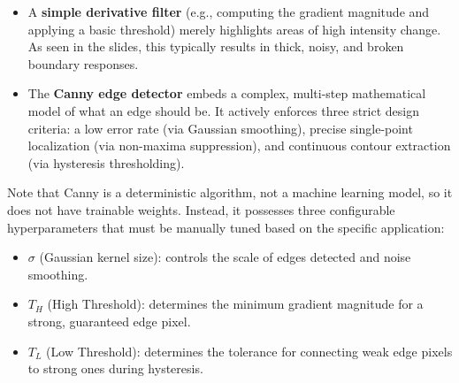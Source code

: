 {\begin{itemize}
    \item A \textbf{simple derivative filter} (e.g., computing the gradient magnitude and applying a basic threshold) merely highlights areas of high intensity change. As seen in the slides, this typically results in thick, noisy, and broken boundary responses.
    \item The \textbf{Canny edge detector} embeds a complex, multi-step mathematical model of what an edge should be. It actively enforces three strict design criteria: a low error rate (via Gaussian smoothing), precise single-point localization (via non-maxima suppression), and continuous contour extraction (via hysteresis thresholding).
\end{itemize}}


{Note that Canny is a deterministic algorithm, not a machine learning model, so it does not have trainable weights. Instead, it possesses three configurable hyperparameters that must be manually tuned based on the specific application:
\begin{itemize}
    \item $\sigma$ (Gaussian kernel size): controls the scale of edges detected and noise smoothing.
    \item $T_H$ (High Threshold): determines the minimum gradient magnitude for a strong, guaranteed edge pixel.
    \item $T_L$ (Low Threshold): determines the tolerance for connecting weak edge pixels to strong ones during hysteresis.
\end{itemize}}

